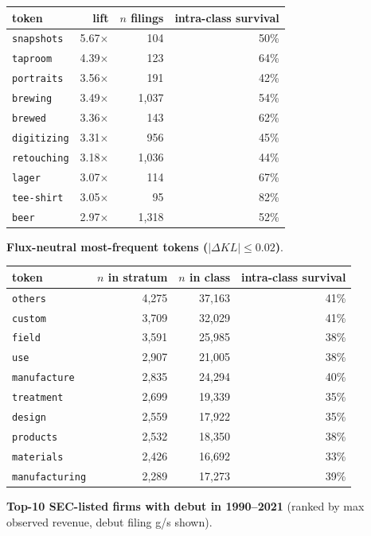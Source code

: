 \begin{tabular}{lrrr}
\toprule
token & lift & $n$ filings & intra-class survival \\
\midrule
\texttt{snapshots} & 5.67$\times$ & 104 & 50\% \\
\texttt{taproom} & 4.39$\times$ & 123 & 64\% \\
\texttt{portraits} & 3.56$\times$ & 191 & 42\% \\
\texttt{brewing} & 3.49$\times$ & 1,037 & 54\% \\
\texttt{brewed} & 3.36$\times$ & 143 & 62\% \\
\texttt{digitizing} & 3.31$\times$ & 956 & 45\% \\
\texttt{retouching} & 3.18$\times$ & 1,036 & 44\% \\
\texttt{lager} & 3.07$\times$ & 114 & 67\% \\
\texttt{tee-shirt} & 3.05$\times$ & 95 & 82\% \\
\texttt{beer} & 2.97$\times$ & 1,318 & 52\% \\
\bottomrule
\end{tabular}

\textbf{Flux-neutral most-frequent tokens ($|\Delta KL|\leq 0.02$)}.

\begin{tabular}{lrrr}
\toprule
token & $n$ in stratum & $n$ in class & intra-class survival \\
\midrule
\texttt{others} & 4,275 & 37,163 & 41\% \\
\texttt{custom} & 3,709 & 32,029 & 41\% \\
\texttt{field} & 3,591 & 25,985 & 38\% \\
\texttt{use} & 2,907 & 21,005 & 38\% \\
\texttt{manufacture} & 2,835 & 24,294 & 40\% \\
\texttt{treatment} & 2,699 & 19,339 & 35\% \\
\texttt{design} & 2,559 & 17,922 & 35\% \\
\texttt{products} & 2,532 & 18,350 & 38\% \\
\texttt{materials} & 2,426 & 16,692 & 33\% \\
\texttt{manufacturing} & 2,289 & 17,273 & 39\% \\
\bottomrule
\end{tabular}

\textbf{Top-10 SEC-listed firms with debut in 1990--2021} (ranked by max observed revenue, debut filing g/s shown).

